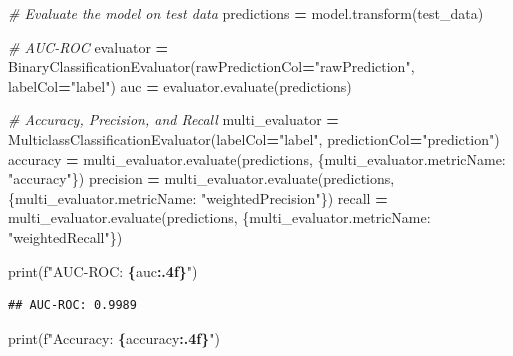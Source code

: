 \documentclass[
]{book}
\newenvironment{Shaded}{\begin{snugshade}}{\end{snugshade}}
\newcommand{\BuiltInTok}[1]{#1}
\newcommand{\CommentTok}[1]{\textcolor[rgb]{0.56,0.35,0.01}{\textit{#1}}}
\newcommand{\NormalTok}[1]{#1}
\newcommand{\OperatorTok}[1]{\textcolor[rgb]{0.81,0.36,0.00}{\textbf{#1}}}
\newcommand{\SpecialCharTok}[1]{\textcolor[rgb]{0.81,0.36,0.00}{\textbf{#1}}}
\newcommand{\SpecialStringTok}[1]{\textcolor[rgb]{0.31,0.60,0.02}{#1}}
\newcommand{\StringTok}[1]{\textcolor[rgb]{0.31,0.60,0.02}{#1}}
\begin{document}
\begin{Shaded}
\begin{Highlighting}[]
\CommentTok{\# Evaluate the model on test data}
\NormalTok{predictions }\OperatorTok{=}\NormalTok{ model.transform(test\_data)}
\end{Highlighting}
\end{Shaded}

\begin{Shaded}
\begin{Highlighting}[]
\CommentTok{\# AUC{-}ROC}
\NormalTok{evaluator }\OperatorTok{=}\NormalTok{ BinaryClassificationEvaluator(rawPredictionCol}\OperatorTok{=}\StringTok{"rawPrediction"}\NormalTok{, labelCol}\OperatorTok{=}\StringTok{"label"}\NormalTok{)}
\NormalTok{auc }\OperatorTok{=}\NormalTok{ evaluator.evaluate(predictions)}
\end{Highlighting}
\end{Shaded}

\begin{Shaded}
\begin{Highlighting}[]
\CommentTok{\# Accuracy, Precision, and Recall}
\NormalTok{multi\_evaluator }\OperatorTok{=}\NormalTok{ MulticlassClassificationEvaluator(labelCol}\OperatorTok{=}\StringTok{"label"}\NormalTok{, predictionCol}\OperatorTok{=}\StringTok{"prediction"}\NormalTok{)}
\NormalTok{accuracy }\OperatorTok{=}\NormalTok{ multi\_evaluator.evaluate(predictions, \{multi\_evaluator.metricName: }\StringTok{"accuracy"}\NormalTok{\})}
\NormalTok{precision }\OperatorTok{=}\NormalTok{ multi\_evaluator.evaluate(predictions, \{multi\_evaluator.metricName: }\StringTok{"weightedPrecision"}\NormalTok{\})}
\NormalTok{recall }\OperatorTok{=}\NormalTok{ multi\_evaluator.evaluate(predictions, \{multi\_evaluator.metricName: }\StringTok{"weightedRecall"}\NormalTok{\})}

\BuiltInTok{print}\NormalTok{(}\SpecialStringTok{f"AUC{-}ROC: }\SpecialCharTok{\{}\NormalTok{auc}\SpecialCharTok{:.4f\}}\SpecialStringTok{"}\NormalTok{)}
\end{Highlighting}
\end{Shaded}

\begin{verbatim}
## AUC-ROC: 0.9989
\end{verbatim}

\begin{Shaded}
\begin{Highlighting}[]
\BuiltInTok{print}\NormalTok{(}\SpecialStringTok{f"Accuracy: }\SpecialCharTok{\{}\NormalTok{accuracy}\SpecialCharTok{:.4f\}}\SpecialStringTok{"}\NormalTok{)}
\end{Highlighting}
\end{Shaded}
\end{document}
